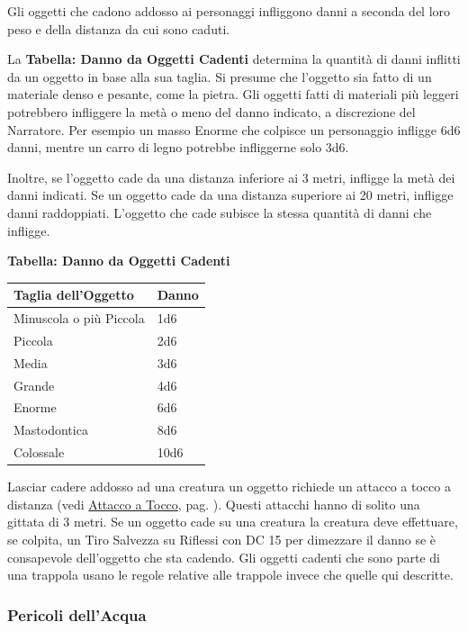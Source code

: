 \begin{multicols}{2}
Gli oggetti che cadono addosso ai personaggi infliggono danni a seconda del loro peso e della distanza da cui sono caduti.

La \textbf{Tabella: Danno da Oggetti Cadenti} determina la quantità di danni inflitti da un oggetto in base alla sua taglia. Si presume che l'oggetto sia fatto di un materiale denso e pesante, come la pietra.
Gli oggetti fatti di materiali più leggeri potrebbero infliggere la metà o meno del danno indicato, a discrezione del Narratore. Per esempio un masso Enorme che colpisce un personaggio infligge 6d6 danni, mentre un carro di legno potrebbe infliggerne solo 3d6.

Inoltre, se l'oggetto cade da una distanza inferiore ai 3 metri, infligge la metà dei danni indicati. Se un oggetto cade da una distanza superiore ai 20 metri, infligge danni raddoppiati. L'oggetto che cade subisce la stessa quantità di danni che infligge.

\bigskip

\textbf{Tabella: Danno da Oggetti Cadenti}

\medskip

\begin{tabular}{ll}
\textbf{Taglia dell'Oggetto} & \textbf{Danno}\\
\toprule
Minuscola o più Piccola & 1d6\\
Piccola & 2d6\\
Media & 3d6\\
Grande & 4d6\\
Enorme & 6d6\\
Mastodontica & 8d6\\
Colossale & 10d6
\end{tabular}

\bigskip

Lasciar cadere addosso ad una creatura un oggetto richiede un attacco a tocco a distanza (vedi \hyperlink{attaccoatocco}{Attacco a Tocco}, pag. \pageref{attaccoatocco}). Questi attacchi hanno di solito una gittata di 3 metri. Se un oggetto cade su una creatura la creatura deve effettuare, se colpita, un Tiro Salvezza su Riflessi con DC 15 per dimezzare il danno se è consapevole dell'oggetto che sta cadendo. Gli oggetti cadenti che sono parte di una trappola usano le regole relative alle trappole invece che quelle qui descritte.

\subsubsection{Pericoli dell'Acqua}\hypertarget{pericoli-dellacqua}{}\label{pericoli-dellacqua} 


\end{multicols}
